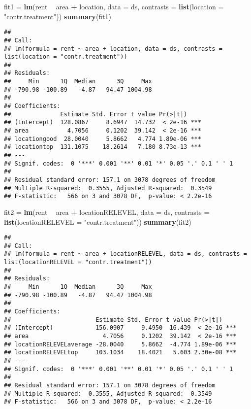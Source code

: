 \documentclass[ignorenonframetext,]{beamer}
\newenvironment{Shaded}{\begin{snugshade}}{\end{snugshade}}
\newcommand{\KeywordTok}[1]{\textcolor[rgb]{0.13,0.29,0.53}{\textbf{#1}}}
\newcommand{\DataTypeTok}[1]{\textcolor[rgb]{0.13,0.29,0.53}{#1}}
\newcommand{\StringTok}[1]{\textcolor[rgb]{0.31,0.60,0.02}{#1}}
\newcommand{\OperatorTok}[1]{\textcolor[rgb]{0.81,0.36,0.00}{\textbf{#1}}}
\newcommand{\NormalTok}[1]{#1}
\begin{document}
\begin{frame}[fragile]

\begin{Shaded}
\begin{Highlighting}[]
\NormalTok{fit1 =}\StringTok{ }\KeywordTok{lm}\NormalTok{(rent }\OperatorTok{~}\StringTok{ }\NormalTok{area }\OperatorTok{+}\StringTok{ }\NormalTok{location, }\DataTypeTok{data =}\NormalTok{ ds, }\DataTypeTok{contrasts =} \KeywordTok{list}\NormalTok{(}\DataTypeTok{location =} \StringTok{"contr.treatment"}\NormalTok{))}
\KeywordTok{summary}\NormalTok{(fit1)}
\end{Highlighting}
\end{Shaded}

\begin{verbatim}
## 
## Call:
## lm(formula = rent ~ area + location, data = ds, contrasts = list(location = "contr.treatment"))
## 
## Residuals:
##     Min      1Q  Median      3Q     Max 
## -790.98 -100.89   -4.87   94.47 1004.98 
## 
## Coefficients:
##              Estimate Std. Error t value Pr(>|t|)    
## (Intercept)  128.0867     8.6947  14.732  < 2e-16 ***
## area           4.7056     0.1202  39.142  < 2e-16 ***
## locationgood  28.0040     5.8662   4.774 1.89e-06 ***
## locationtop  131.1075    18.2614   7.180 8.73e-13 ***
## ---
## Signif. codes:  0 '***' 0.001 '**' 0.01 '*' 0.05 '.' 0.1 ' ' 1
## 
## Residual standard error: 157.1 on 3078 degrees of freedom
## Multiple R-squared:  0.3555, Adjusted R-squared:  0.3549 
## F-statistic:   566 on 3 and 3078 DF,  p-value: < 2.2e-16
\end{verbatim}

\begin{Shaded}
\begin{Highlighting}[]
\NormalTok{fit2 =}\StringTok{ }\KeywordTok{lm}\NormalTok{(rent }\OperatorTok{~}\StringTok{ }\NormalTok{area }\OperatorTok{+}\StringTok{ }\NormalTok{locationRELEVEL, }\DataTypeTok{data =}\NormalTok{ ds, }\DataTypeTok{contrasts =} \KeywordTok{list}\NormalTok{(}\DataTypeTok{locationRELEVEL =} \StringTok{"contr.treatment"}\NormalTok{))}
\KeywordTok{summary}\NormalTok{(fit2)}
\end{Highlighting}
\end{Shaded}

\begin{verbatim}
## 
## Call:
## lm(formula = rent ~ area + locationRELEVEL, data = ds, contrasts = list(locationRELEVEL = "contr.treatment"))
## 
## Residuals:
##     Min      1Q  Median      3Q     Max 
## -790.98 -100.89   -4.87   94.47 1004.98 
## 
## Coefficients:
##                        Estimate Std. Error t value Pr(>|t|)    
## (Intercept)            156.0907     9.4950  16.439  < 2e-16 ***
## area                     4.7056     0.1202  39.142  < 2e-16 ***
## locationRELEVELaverage -28.0040     5.8662  -4.774 1.89e-06 ***
## locationRELEVELtop     103.1034    18.4021   5.603 2.30e-08 ***
## ---
## Signif. codes:  0 '***' 0.001 '**' 0.01 '*' 0.05 '.' 0.1 ' ' 1
## 
## Residual standard error: 157.1 on 3078 degrees of freedom
## Multiple R-squared:  0.3555, Adjusted R-squared:  0.3549 
## F-statistic:   566 on 3 and 3078 DF,  p-value: < 2.2e-16
\end{verbatim}


\end{frame}
\end{document}
